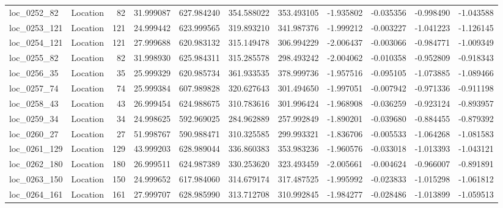 \begin{tabular}{llrrrrrrrrr}
  loc_0252_82 &        Location &              82 &  31.999087 & 627.984240 &  354.588022 &    353.493105 &  -1.935802 &  -0.035356 &   -0.998490 &     -1.043588 \\
 loc_0253_121 &        Location &             121 &  24.999442 & 623.999565 &  319.893210 &    341.987376 &  -1.999212 &  -0.003227 &   -1.041223 &     -1.126145 \\
 loc_0254_121 &        Location &             121 &  27.999688 & 620.983132 &  315.149478 &    306.994229 &  -2.006437 &  -0.003066 &   -0.984771 &     -1.009349 \\
  loc_0255_82 &        Location &              82 &  31.998930 & 625.984311 &  315.285578 &    298.493242 &  -2.004062 &  -0.010358 &   -0.952809 &     -0.918343 \\
  loc_0256_35 &        Location &              35 &  25.999329 & 620.985734 &  361.933535 &    378.999736 &  -1.957516 &  -0.095105 &   -1.073885 &     -1.089466 \\
  loc_0257_74 &        Location &              74 &  25.999384 & 607.989828 &  320.627643 &    301.494650 &  -1.997051 &  -0.007942 &   -0.971336 &     -0.911198 \\
  loc_0258_43 &        Location &              43 &  26.999454 & 624.988675 &  310.783616 &    301.996424 &  -1.968908 &  -0.036259 &   -0.923124 &     -0.893957 \\
  loc_0259_34 &        Location &              34 &  24.998625 & 592.969025 &  284.962889 &    257.992849 &  -1.890201 &  -0.039680 &   -0.884455 &     -0.879392 \\
  loc_0260_27 &        Location &              27 &  51.998767 & 590.988471 &  310.325585 &    299.993321 &  -1.836706 &  -0.005533 &   -1.064268 &     -1.081583 \\
 loc_0261_129 &        Location &             129 &  43.999203 & 628.989044 &  336.860383 &    353.983236 &  -1.960576 &  -0.033018 &   -1.013393 &     -1.043121 \\
 loc_0262_180 &        Location &             180 &  26.999511 & 624.987389 &  330.253620 &    323.493459 &  -2.005661 &  -0.004624 &   -0.966007 &     -0.891891 \\
 loc_0263_150 &        Location &             150 &  24.999652 & 617.984060 &  314.679174 &    317.487525 &  -1.995992 &  -0.023833 &   -1.015298 &     -1.061812 \\
 loc_0264_161 &        Location &             161 &  27.999707 & 628.985990 &  313.712708 &    310.992845 &  -1.984277 &  -0.028486 &   -1.013899 &     -1.059513 \\

\end{tabular}
